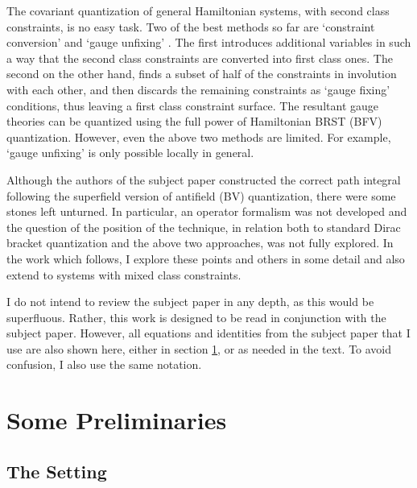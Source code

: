 \documentclass[a4paper,12pt]{article}
\theoremstyle{definition}
\theoremstyle{remark}
\numberwithin{equation}{section}
\begin{document}
The covariant quantization of general Hamiltonian systems, with
second class constraints, is no easy task. Two of the best methods
so far are `constraint conversion'
\cite{Batalin:1987fm,Batalin:1990mb,Batalin:1991jm} and `gauge
unfixing' \cite{Harada:1990aj,Mitra:1990mp}. The first
introduces additional variables in such a way that the second class
constraints are converted into first class ones. The second on the
other hand, finds a subset of half of the constraints in involution
with each other, and then discards the remaining constraints as
`gauge fixing' conditions, thus leaving a first class constraint
surface. The resultant gauge theories can be quantized using the
full power of Hamiltonian BRST (BFV) quantization. However, even
the above two methods are limited. For example, `gauge unfixing' is
only possible locally in general.

Although the authors of the subject paper \cite{Batalin:2001hs}
constructed the correct path integral following the superfield
version of antifield (BV) quantization, there were some stones left
unturned. In particular, an operator formalism was not developed
and the question of the position of the technique, in relation
both to standard Dirac bracket quantization and the above two
approaches, was not fully explored. In the work which follows, I
explore these points and others in some detail and also extend
to systems with mixed class constraints.

I do not intend to review the subject paper in any depth, as this
would be superfluous. Rather, this work is designed to be read in
conjunction with the subject paper. However, all equations and
identities from the subject paper that I use are also shown here,
either in section \ref{sec:BMequations}, or as needed in the text.
To avoid confusion, I also use the same notation.

\section{Some Preliminaries}
\label{sec:BMequations}

\subsection{The Setting}
\label{sec:Setting}
\end{document}
